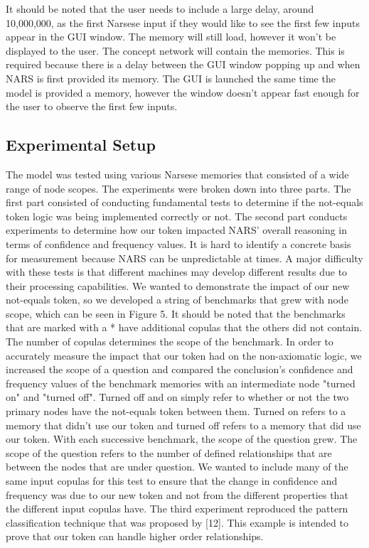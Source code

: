 \documentclass[conference]{IEEEtran}
\begin{document}
	It should be noted that the user needs to include a large delay, around 10,000,000, as the first Narsese input if they would like to see the first few inputs appear in the GUI window. The memory will still load, however it won't be displayed to the user. The concept network will contain the memories. This is required because there is a delay between the GUI window popping up and when NARS is first provided its memory. The GUI is launched the same time the model is provided a memory, however the window doesn't appear fast enough for the user to observe the first few inputs.    

\subsection{Experimental Setup}
	The model was tested using various Narsese memories that consisted of a wide range of node scopes. The experiments were broken down into three parts. The first part consisted of conducting fundamental tests to determine if the not-equals token logic was being implemented correctly or not. The second part conducts experiments to determine how our token impacted NARS' overall reasoning in terms of confidence and frequency values. It is hard to identify a concrete basis for measurement because NARS can be unpredictable at times. A major difficulty with these tests is that different machines may develop different results due to their processing capabilities. We wanted to demonstrate the impact of our new not-equals token, so we developed a string of benchmarks that grew with node scope, which can be seen in Figure 5. It should be noted that the benchmarks that are marked with a * have additional copulas that the others did not contain. The number of copulas determines the scope of the benchmark. In order to accurately measure the impact that our token had on the non-axiomatic logic, we increased the scope of a question and compared the conclusion's confidence and frequency values of the benchmark memories with an intermediate node "turned on" and "turned off". Turned off and on simply refer to whether or not the two primary nodes have the not-equals token between them. Turned on refers to a memory that didn't use our token and turned off refers to a memory that did use our token. With each successive benchmark, the scope of the question grew. The scope of the question refers to the number of defined relationships that are between the nodes that are under question. We wanted to include many of the same input copulas for this test to ensure that the change in confidence and frequency was due to our new token and not from the different properties that the different input copulas have. The third experiment reproduced the pattern classification technique that was proposed by [12]. This example is intended to prove that our token can handle higher order relationships.
	
\end{document}
